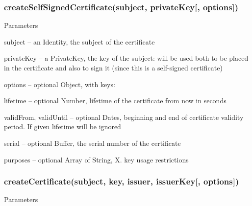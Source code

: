 \subsubsection*{{\ttfamily create\+Self\+Signed\+Certificate(subject, private\+Key\mbox{[}, options\mbox{]})}}

Parameters


\begin{DoxyItemize}
\item {\ttfamily subject} -- an Identity, the subject of the certificate
\item {\ttfamily private\+Key} -- a Private\+Key, the key of the subject\+: will be used both to be placed in the certificate and also to sign it (since this is a self-\/signed certificate)
\item {\ttfamily options} -- optional Object, with keys\+:
\begin{DoxyItemize}
\item {\ttfamily lifetime} -- optional Number, lifetime of the certificate from now in seconds
\item {\ttfamily valid\+From}, {\ttfamily valid\+Until} -- optional Dates, beginning and end of certificate validity period. If given {\ttfamily lifetime} will be ignored
\item {\ttfamily serial} -- optional Buffer, the serial number of the certificate
\item {\ttfamily purposes} -- optional Array of String, X. key usage restrictions
\end{DoxyItemize}
\end{DoxyItemize}

\subsubsection*{{\ttfamily create\+Certificate(subject, key, issuer, issuer\+Key\mbox{[}, options\mbox{]})}}

Parameters


